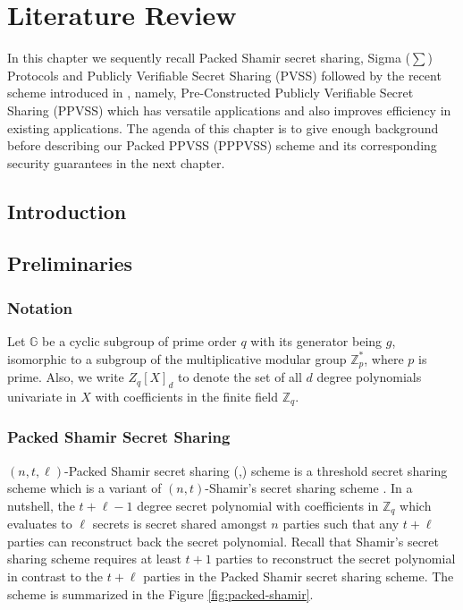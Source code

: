 \chapter{Literature Review}
\label{cha:1}
In this chapter we sequently recall Packed Shamir secret sharing, 
Sigma ($\sum$) Protocols and Publicly Verifiable Secret Sharing (PVSS) followed by
the recent scheme introduced in \cite{cryptoeprint:2025/576}, namely, 
Pre-Constructed Publicly Verifiable Secret Sharing (PPVSS) which has versatile 
applications and also improves efficiency in existing applications.
The agenda of this chapter is to give enough background before describing our Packed PPVSS (PPPVSS) scheme 
and its corresponding security guarantees in the next chapter.

\section{Introduction}

\section{Preliminaries}
\label{sec:preliminaries}
\subsection{Notation}
Let $\mathbb{G}$ be a cyclic subgroup of prime order $q$ with its generator being 
$g$, isomorphic to a subgroup of the multiplicative modular group $\mathbb{Z}_p^*$, 
where $p$ is prime. Also, we write $Z_{q}[X]_d$ to denote the set of all $d$ degree 
polynomials univariate in $X$ with coefficients in the finite field $\mathbb{Z}_q$. 

\subsection{Packed Shamir Secret Sharing}
\label{sec:packed-shamir}
$(n,t,\ell)$-Packed Shamir secret sharing (\cite{10.1145/129712.129780},\cite{crypto-1984-905})
 scheme is a threshold secret sharing scheme which is a variant of $(n,t)$-Shamir's 
 secret sharing scheme \cite{10.1145/359168.359176}. In a nutshell, the $t+\ell-1$ 
 degree secret polynomial with coefficients in $\mathbb{Z}_q$ which evaluates to $\ell$ 
 secrets is secret shared amongst $n$ parties such that any $t+\ell$ parties can 
 reconstruct back the secret polynomial. Recall that Shamir's secret sharing scheme 
 requires at least $t+1$ parties to reconstruct the secret polynomial in contrast to 
 the $t+\ell$ parties in the Packed Shamir secret sharing scheme. The scheme is
 summarized in the Figure \ref{fig:packed-shamir}.


